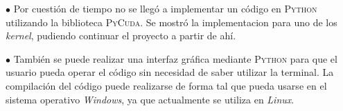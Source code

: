 $\bullet$ Por cuestión de tiempo no se llegó a implementar un código en \textsc{Python} utilizando la biblioteca \textsc{PyCuda}. Se mostró la implementacion para uno de los \textit{kernel}, pudiendo continuar el proyecto a partir de ahí. 

$\bullet$ También se puede realizar una interfaz gráfica mediante \textsc{Python} para que el usuario pueda operar el código sin necesidad de saber utilizar la terminal. La compilación del código puede realizarse de forma tal que pueda usarse en el sistema operativo \textit{Windows}, ya que actualmente se utiliza en \textit{Linux}. 